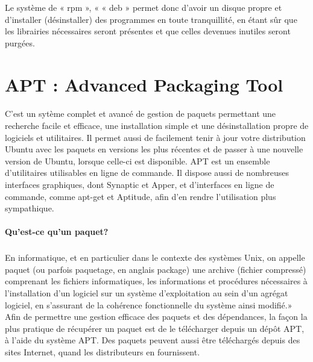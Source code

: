 \documentclass[a4paper,12pt]{article}
\begin{document}
Le système de « rpm », « « deb » permet donc d’avoir un disque propre et d’installer (désinstaller) des programmes en toute tranquillité, 
en étant sûr que les librairies nécessaires seront présentes et que celles devenues inutiles seront purgées.


\section{APT : Advanced Packaging Tool}
\paragraph{}
C'est un sytème complet et avancé de gestion de paquets permettant une recherche facile et efficace, une installation simple et une désinstallation propre de logiciels et utilitaires. 
Il permet aussi de facilement tenir à jour votre distribution Ubuntu avec les paquets en versions les plus récentes et de passer à une nouvelle version de Ubuntu, lorsque celle-ci est disponible.
APT est un ensemble d'utilitaires utilisables en ligne de commande. Il dispose aussi de nombreuses interfaces graphiques, dont Synaptic et Apper, et d'interfaces en ligne de commande, comme apt-get 
et Aptitude, afin d'en rendre l'utilisation plus sympathique.

\paragraph{Qu'est-ce qu'un paquet?}
\subparagraph{}
En informatique, et en particulier dans le contexte des systèmes Unix, on appelle paquet (ou parfois paquetage, en anglais package) une archive (fichier compressé) comprenant les fichiers informatiques, 
les informations et procédures nécessaires à l'installation d'un logiciel sur un système d'exploitation au sein d'un agrégat logiciel, en s'assurant de la cohérence fonctionnelle du système ainsi modifié.» 	
Afin de permettre une gestion efficace des paquets et des dépendances, la façon la plus pratique de récupérer un paquet est de le télécharger depuis un dépôt APT, à l'aide du système APT. Des paquets 
peuvent aussi être téléchargés depuis des sites Internet, quand les distributeurs en fournissent.
\end{document}
